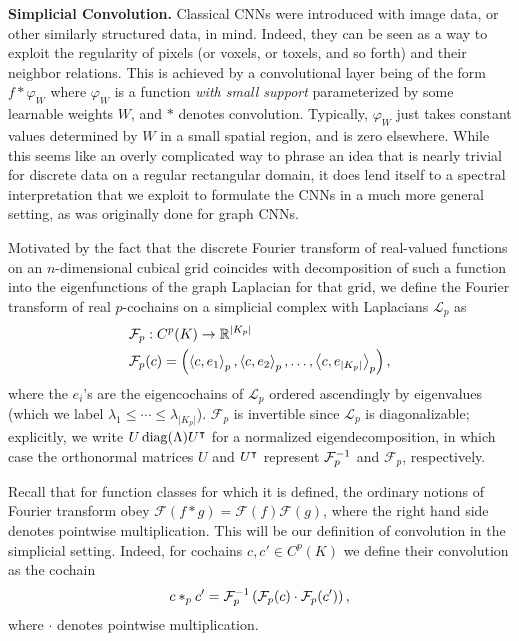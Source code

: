 
\textbf{Simplicial Convolution.} Classical CNNs were introduced with image data, or other similarly structured data, in mind. Indeed, they can be seen as a way to exploit the regularity of pixels (or voxels, or toxels, and so forth) and their neighbor relations. This is achieved by a convolutional layer being of the form $f\ast \varphi_W$ where $\varphi_W$ is a function \emph{with small support} parameterized by some learnable weights $W$, and $\ast$ denotes convolution. Typically, $\varphi_W$ just takes constant values determined by $W$ in a small spatial region, and is zero elsewhere. While this seems like an overly complicated way to phrase an idea that is nearly trivial for discrete data on a regular rectangular domain, it does lend itself to a spectral interpretation that we exploit to formulate the CNNs in a much more general setting, as was originally done for graph CNNs.

Motivated by the fact that the discrete Fourier transform of real-valued functions on an $n$-dimensional cubical grid coincides with decomposition of such a function into the eigenfunctions of the graph Laplacian for that grid, we define the Fourier transform of real $p$-cochains on a simplicial complex with Laplacians $\mathcal{L}_p$ as
\begin{align*}
  &\mathcal{F}_p: C^p(K) \to \mathbb{R}^{\lvert K_p \rvert} \\
  &\mathcal{F}_p(c) = \left(\left\langle c , e_1 \right\rangle_p, \left\langle c , e_2 \right\rangle_p, \dotsc, \left\langle c , e_{\lvert K_p \rvert} \right\rangle_p\right),
\end{align*}
where the $e_i$'s are the eigencochains of $\mathcal{L}_p$ ordered ascendingly by eigenvalues (which we label $\lambda_1\leq\dotsm\leq\lambda_{\lvert K_p \rvert}$). $\mathcal{F}_p$ is invertible since $\mathcal{L}_p$ is diagonalizable; explicitly, we write $U\operatorname{diag}(\Lambda)U^{\intercal}$ for a normalized eigendecomposition, in which case the orthonormal matrices $U$ and $U^{\intercal}$ represent $\mathcal{F}^{-1}_p$ and $\mathcal{F}_p$, respectively.

Recall that for function classes for which it is defined, the ordinary notions of Fourier transform obey $\mathcal{F}(f\ast g)=\mathcal{F}(f)\mathcal{F}(g)$, where the right hand side denotes pointwise multiplication. This will be our definition of convolution in the simplicial setting. Indeed, for cochains $c,c'\in C^p(K)$ we define their convolution as the cochain
\begin{equation*}
  c\ast_p c' = \mathcal{F}_p^{-1}\left(\mathcal{F}_p(c)\cdot\mathcal{F}_p(c')\right),
\end{equation*}
where $\cdot$ denotes pointwise multiplication.


